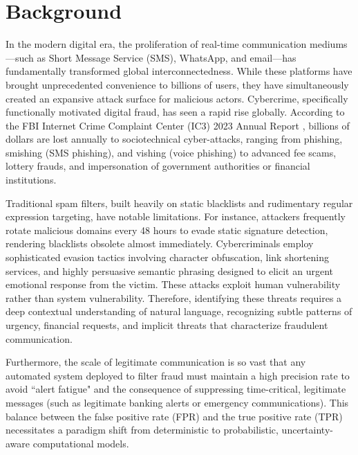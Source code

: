 \section{Background}
In the modern digital era, the proliferation of real-time communication mediums---such as Short Message Service (SMS), WhatsApp, and email---has fundamentally transformed global interconnectedness. While these platforms have brought unprecedented convenience to billions of users, they have simultaneously created an expansive attack surface for malicious actors. Cybercrime, specifically functionally motivated digital fraud, has seen a rapid rise globally. According to the FBI Internet Crime Complaint Center (IC3) 2023 Annual Report \cite{ic3_2023}, billions of dollars are lost annually to sociotechnical cyber-attacks, ranging from phishing, smishing (SMS phishing), and vishing (voice phishing) to advanced fee scams, lottery frauds, and impersonation of government authorities or financial institutions.

Traditional spam filters, built heavily on static blacklists and rudimentary regular expression targeting, have notable limitations. For instance, attackers frequently rotate malicious domains every 48 hours to evade static signature detection, rendering blacklists obsolete almost immediately. Cybercriminals employ sophisticated evasion tactics involving character obfuscation, link shortening services, and highly persuasive semantic phrasing designed to elicit an urgent emotional response from the victim. These attacks exploit human vulnerability rather than system vulnerability. Therefore, identifying these threats requires a deep contextual understanding of natural language, recognizing subtle patterns of urgency, financial requests, and implicit threats that characterize fraudulent communication.

Furthermore, the scale of legitimate communication is so vast that any automated system deployed to filter fraud must maintain a high precision rate to avoid ``alert fatigue" and the consequence of suppressing time-critical, legitimate messages (such as legitimate banking alerts or emergency communications). This balance between the false positive rate (FPR) and the true positive rate (TPR) necessitates a paradigm shift from deterministic to probabilistic, uncertainty-aware computational models. 

